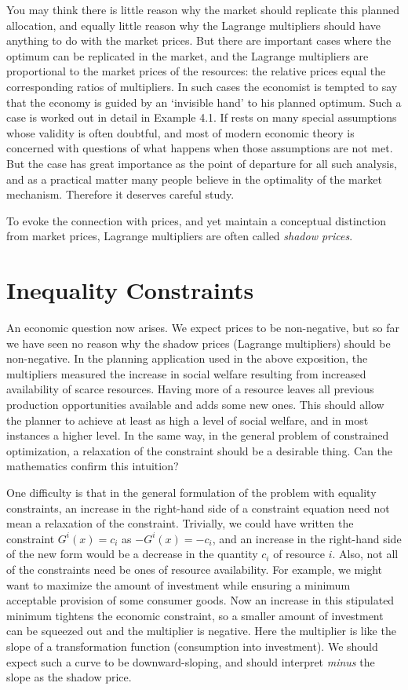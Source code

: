 You may think there is little reason why the market should replicate this planned allocation, and equally little reason why the Lagrange multipliers should have anything to do with the market prices. But there are important cases where the optimum can be replicated in the market, and the Lagrange multipliers are proportional to the market prices of the resources: the relative prices equal the corresponding ratios of multipliers. In such cases the economist is tempted to say that the economy is guided by an `invisible hand' to his planned optimum. Such a case is worked out in detail in Example 4.1. If rests on many special assumptions whose validity is often doubtful, and most of modern economic theory is concerned with questions of what happens when those assumptions are not met. But the case has great importance as the point of departure for all such analysis, and as a practical matter many people believe in the optimality of the market mechanism. Therefore it deserves careful study.

To evoke the connection with prices, and yet maintain a conceptual distinction from market prices, Lagrange multipliers are often called \textit{shadow prices}.

\section*{Inequality Constraints}

An economic question now arises. We expect prices to be non-negative, but so far we have seen no reason why the shadow prices (Lagrange multipliers) should be non-negative. In the planning application used in the above exposition, the multipliers measured the increase in social welfare resulting from increased availability of scarce resources. Having more of a resource leaves all previous production opportunities available and adds some new ones. This should allow the planner to achieve at least as high a level of social welfare, and in most instances a higher level. In the same way, in the general problem of constrained optimization, a relaxation of the constraint should be a desirable thing. Can the mathematics confirm this intuition?

One difficulty is that in the general formulation of the problem with equality constraints, an increase in the right-hand side of a constraint equation need not mean a relaxation of the constraint. Trivially, we could have written the constraint $G^i(x)=c_i$ as $-G^i(x)=-c_i$, and an increase in the right-hand side of the new form would be a decrease in the quantity $c_i$ of resource $i$. Also, not all of the constraints need be ones of resource availability. For example, we might want to maximize the amount of investment while ensuring a minimum acceptable provision of some consumer goods. Now an increase in this stipulated minimum tightens the economic constraint, so a smaller amount of investment can be squeezed out and the multiplier is negative. Here the multiplier is like the slope of a transformation function (consumption into investment). We should expect such a curve to be downward-sloping, and should interpret \textit{minus} the slope as the shadow price.

